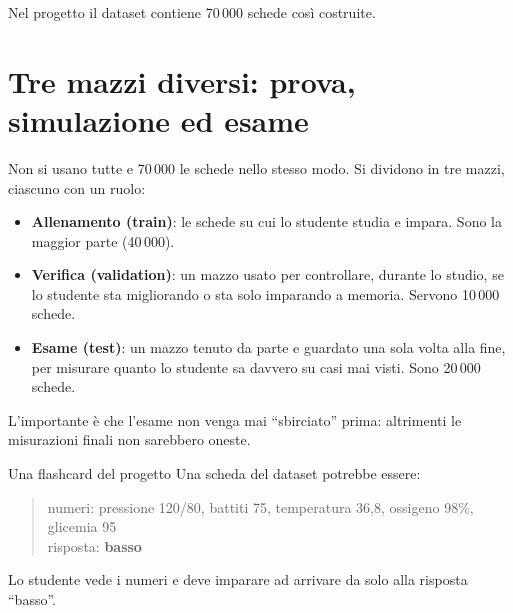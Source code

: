 Nel progetto il dataset contiene 70\,000 schede così costruite.

\section{Tre mazzi diversi: prova, simulazione ed esame}\label{sec:p1-dati-split}

Non si usano tutte e 70\,000 le schede nello stesso modo. Si dividono in tre
mazzi, ciascuno con un ruolo:

\begin{itemize}
  \item \textbf{Allenamento (train)}: le schede su cui lo studente studia e
        impara. Sono la maggior parte (40\,000).
  \item \textbf{Verifica (validation)}: un mazzo usato per controllare, durante
        lo studio, se lo studente sta migliorando o sta solo imparando a
        memoria. Servono 10\,000 schede.
  \item \textbf{Esame (test)}: un mazzo tenuto da parte e guardato una sola
        volta alla fine, per misurare quanto lo studente sa davvero su casi
        mai visti. Sono 20\,000 schede.
\end{itemize}

L'importante è che l'esame non venga mai ``sbirciato'' prima: altrimenti le
misurazioni finali non sarebbero oneste.

\begin{esempio}{Una flashcard del progetto}
Una scheda del dataset potrebbe essere:
\begin{quote}
numeri: pressione 120/80, battiti 75, temperatura 36,8, ossigeno 98\%,
glicemia 95 \\
risposta: \textbf{basso}
\end{quote}
Lo studente vede i numeri e deve imparare ad arrivare da solo alla risposta
``basso''.
\end{esempio}
